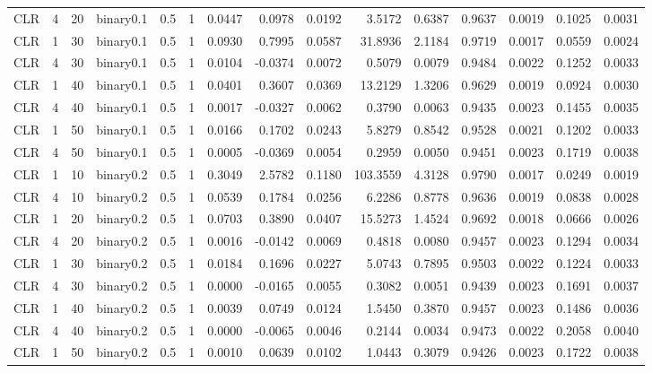 \begin{longtable}{rrrrrrrrrrrrrrr}
  CLR & 4 & 20 & binary0.1 & 0.5 & 1 & 0.0447 & 0.0978 & 0.0192 & 3.5172 & 0.6387 & 0.9637 & 0.0019 & 0.1025 & 0.0031 \\ 
  CLR & 1 & 30 & binary0.1 & 0.5 & 1 & 0.0930 & 0.7995 & 0.0587 & 31.8936 & 2.1184 & 0.9719 & 0.0017 & 0.0559 & 0.0024 \\ 
  CLR & 4 & 30 & binary0.1 & 0.5 & 1 & 0.0104 & -0.0374 & 0.0072 & 0.5079 & 0.0079 & 0.9484 & 0.0022 & 0.1252 & 0.0033 \\ 
  CLR & 1 & 40 & binary0.1 & 0.5 & 1 & 0.0401 & 0.3607 & 0.0369 & 13.2129 & 1.3206 & 0.9629 & 0.0019 & 0.0924 & 0.0030 \\ 
  CLR & 4 & 40 & binary0.1 & 0.5 & 1 & 0.0017 & -0.0327 & 0.0062 & 0.3790 & 0.0063 & 0.9435 & 0.0023 & 0.1455 & 0.0035 \\ 
  CLR & 1 & 50 & binary0.1 & 0.5 & 1 & 0.0166 & 0.1702 & 0.0243 & 5.8279 & 0.8542 & 0.9528 & 0.0021 & 0.1202 & 0.0033 \\ 
  CLR & 4 & 50 & binary0.1 & 0.5 & 1 & 0.0005 & -0.0369 & 0.0054 & 0.2959 & 0.0050 & 0.9451 & 0.0023 & 0.1719 & 0.0038 \\ 
  CLR & 1 & 10 & binary0.2 & 0.5 & 1 & 0.3049 & 2.5782 & 0.1180 & 103.3559 & 4.3128 & 0.9790 & 0.0017 & 0.0249 & 0.0019 \\ 
  CLR & 4 & 10 & binary0.2 & 0.5 & 1 & 0.0539 & 0.1784 & 0.0256 & 6.2286 & 0.8778 & 0.9636 & 0.0019 & 0.0838 & 0.0028 \\ 
  CLR & 1 & 20 & binary0.2 & 0.5 & 1 & 0.0703 & 0.3890 & 0.0407 & 15.5273 & 1.4524 & 0.9692 & 0.0018 & 0.0666 & 0.0026 \\ 
  CLR & 4 & 20 & binary0.2 & 0.5 & 1 & 0.0016 & -0.0142 & 0.0069 & 0.4818 & 0.0080 & 0.9457 & 0.0023 & 0.1294 & 0.0034 \\ 
  CLR & 1 & 30 & binary0.2 & 0.5 & 1 & 0.0184 & 0.1696 & 0.0227 & 5.0743 & 0.7895 & 0.9503 & 0.0022 & 0.1224 & 0.0033 \\ 
  CLR & 4 & 30 & binary0.2 & 0.5 & 1 & 0.0000 & -0.0165 & 0.0055 & 0.3082 & 0.0051 & 0.9439 & 0.0023 & 0.1691 & 0.0037 \\ 
  CLR & 1 & 40 & binary0.2 & 0.5 & 1 & 0.0039 & 0.0749 & 0.0124 & 1.5450 & 0.3870 & 0.9457 & 0.0023 & 0.1486 & 0.0036 \\ 
  CLR & 4 & 40 & binary0.2 & 0.5 & 1 & 0.0000 & -0.0065 & 0.0046 & 0.2144 & 0.0034 & 0.9473 & 0.0022 & 0.2058 & 0.0040 \\ 
  CLR & 1 & 50 & binary0.2 & 0.5 & 1 & 0.0010 & 0.0639 & 0.0102 & 1.0443 & 0.3079 & 0.9426 & 0.0023 & 0.1722 & 0.0038 \\ 

\end{longtable}
